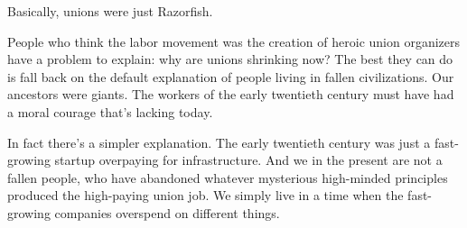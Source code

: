 Basically, unions were just Razorfish.

People who think the labor movement was the creation of heroic union
organizers have a problem to explain: why are unions shrinking now? The
best they can do is fall back on the default explanation of people
living in fallen civilizations. Our ancestors were giants. The workers
of the early twentieth century must have had a moral courage that's
lacking today.

In fact there's a simpler explanation. The early twentieth century was
just a fast-growing startup overpaying for infrastructure. And we in the
present are not a fallen people, who have abandoned whatever mysterious
high-minded principles produced the high-paying union job. We simply
live in a time when the fast-growing companies overspend on different
things.
